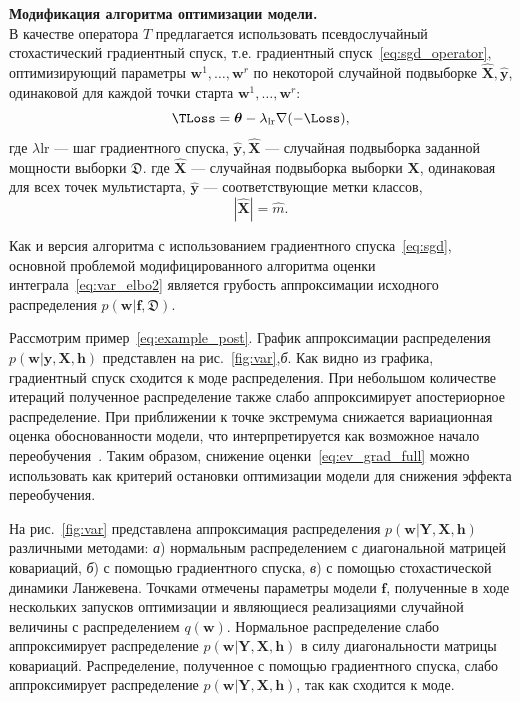 \textbf{Модификация алгоритма оптимизации модели.} \\
В качестве оператора $T$ предлагается использовать псевдослучайный стохастический градиентный спуск, т.е. градиентный спуск~\eqref{eq:sgd_operator}, оптимизирующий параметры $\mathbf{w}^1,\dots,\mathbf{w}^r$ по некоторой случайной подвыборке $\hat{\mathbf{X}}, \hat{\mathbf{y}}$, одинаковой для каждой точки старта $\mathbf{w}^1,\dots,\mathbf{w}^r$:
\[
    \TLoss = \boldsymbol{\theta} - \lambda_{\text{lr}}\nabla  (-\Loss),
\]
где $\lambda{\text{lr}}$ --- шаг градиентного спуска, $\hat{\mathbf{y}}, \hat{\mathbf{X}}$ --- случайная подвыборка заданной мощности выборки $\mathfrak{D}$.
где $\hat{\mathbf{X}}$ --- случайная подвыборка выборки ${\mathbf{X}}$, одинаковая для всех точек мультистарта, $\hat{\mathbf{y}}$ --- соответствующие метки классов, $$|\hat{\mathbf{X}}| = \hat{m}.$$

Как и версия алгоритма с использованием градиентного спуска~\eqref{eq:sgd}, основной проблемой модифицированного алгоритма оценки интеграла~\eqref{eq:var_elbo2} является грубость аппроксимации исходного распределения $p(\mathbf{w}|\mathbf{f},\mathfrak{D})$.

Рассмотрим пример~\eqref{eq:example_post}.
График аппроксимации распределения $p(\mathbf{w}|\mathbf{y}, \mathbf{X}, \mathbf{h})$ представлен на рис.~\ref{fig:var},\textit{б}.
Как видно из графика, градиентный спуск сходится к моде распределения. При небольшом количестве итераций полученное распределение также слабо аппроксимирует апостериорное распределение. {При приближении к точке экстремума снижается вариационная оценка обоснованности модели, что  интерпретируется как возможное начало переобучения~\cite{early}. Таким образом, снижение оценки~\eqref{eq:ev_grad_full} можно использовать как критерий остановки оптимизации модели для снижения эффекта переобучения.  }

На рис.~\ref{fig:var} представлена  {аппроксимация распределения $p(\mathbf{w}|\mathbf{Y}, \mathbf{X}, \mathbf{h})$ различными методами: \textit{а}) нормальным распределением с диагональной матрицей ковариаций, \textit{б}) с помощью градиентного спуска, \textit{в}) с помощью стохастической динамики Ланжевена. Точками отмечены параметры модели $\mathbf{f}$, полученные в ходе нескольких запусков оптимизации и являющиеся реализациями случайной величины с распределением $q(\mathbf{w})$. Нормальное распределение слабо аппроксимирует распределение $p(\mathbf{w}|\mathbf{Y}, \mathbf{X}, \mathbf{h})$ в силу диагональности матрицы ковариаций. Распределение, полученное с помощью градиентного спуска, слабо аппроксимирует распределение $p(\mathbf{w}|\mathbf{Y}, \mathbf{X}, \mathbf{h})$, так как сходится к моде.}





